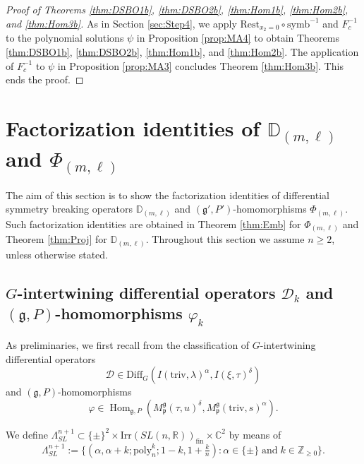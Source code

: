 \documentclass[reqno,11pt]{amsart}
\theoremstyle{remark}
\theoremstyle{definition}
\numberwithin{equation}{section}
\newcommand{\ga}{\alpha}
\newcommand{\fg}{{\mathfrak g}}
\newcommand{\fp}{{\mathfrak p}}
\newcommand{\R}{\mathbb{R}}
\newcommand{\C}{\mathbb{C}}
\newcommand{\Z}{\mathbb{Z}}
\newcommand{\Cal}{\mathcal}
\newcommand{\Hom}{\operatorname{Hom}}
\newcommand{\poly}{\mathrm{poly}}
\newcommand{\Diff}{\mathrm{Diff}}
\newcommand{\Irr}{\mathrm{Irr}}
\newcommand{\triv}{\mathrm{triv}}
\newcommand{\fin}{\mathrm{fin}}
\newcommand{\symb}{\mathrm{symb}}
\newcommand{\Mp}{M^{\fg}_{\fp}}
\newcommand{\Rest}{\mathrm{Rest}}
\newcommand{\D}{\Cal{D}}
\newcommand{\bD}{\mathbb{D}}
\begin{document}
\begin{proof}[Proof of 
Theorems \ref{thm:DSBO1b}, \ref{thm:DSBO2b}, \ref{thm:Hom1b},
\ref{thm:Hom2b}, and \ref{thm:Hom3b}]
As in Section \ref{sec:Step4}, we apply $\Rest_{x_2=0}\circ \symb^{-1}$ and $F_c^{-1}$
to the polynomial solutions $\psi$ in Proposition \ref{prop:MA4} to 
obtain
Theorems \ref{thm:DSBO1b}, \ref{thm:DSBO2b}, \ref{thm:Hom1b},
and \ref{thm:Hom2b}. 
The application of  $F_c^{-1}$ to $\psi$ in Proposition \ref{prop:MA3}
concludes Theorem \ref{thm:Hom3b}. This ends the proof. 
\end{proof}

\section{Factorization identities of $\bD_{(m,\ell)}$ and $\Phi_{(m,\ell)}$}
\label{sec:factor1}

The aim of this section is to show the factorization identities of 
differential symmetry breaking operators $\bD_{(m,\ell)}$
and $(\fg', P')$-homomorphisms $\Phi_{(m,\ell)}$.
Such factorization identities are obtained in
Theorem \ref{thm:Emb} for $\Phi_{(m,\ell)}$ and 
 Theorem \ref{thm:Proj} for $\bD_{(m,\ell)}$.
Throughout this section we assume $n \geq 2$, unless otherwise stated.


\subsection{$G$-intertwining differential operators $\D_k$ 
and $(\fg, P)$-homomorphisms $\varphi_k$}
\label{sec:71}

As preliminaries,
we first recall from \cite{KuOr24} the classification of $G$-intertwining differential 
operators 
\begin{equation*}
\D \in \Diff_G(I(\triv, \lambda)^\alpha, I(\xi, \tau)^\delta)
\end{equation*}
and $(\fg, P)$-homomorphisms 
\begin{equation*}
\varphi \in
\Hom_{\fg, P}(\Mp(\tau,u)^\delta, \Mp(\triv, s)^\ga).
\end{equation*}

We define $\Lambda^{n+1}_{SL} 
\subset \{\pm\}^2 \times \Irr(SL(n,\R))_{\fin} \times \C^2$ by means of
\begin{equation*}
\Lambda^{n+1}_{SL}:=\{
(\alpha, \alpha+k;\poly_{n}^k; 1-k, 
1+\tfrac{k}{n} ): \alpha \in \{\pm\} \; \text{and} \; k\in \Z_{\geq 0}\}.
\end{equation*}
\end{document}
